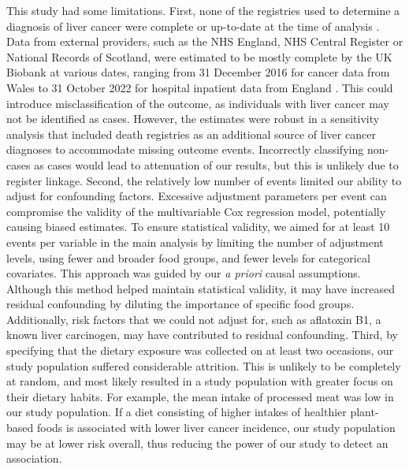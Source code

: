 \documentclass[sn-basic,Numbered,iicol,pdflatex]{sn-jnl}
\begin{document}
This study had some limitations. First, none of the registries used to
determine a diagnosis of liver cancer were complete or up-to-date at the
time of analysis \citep{RN112}. Data from external providers, such as the NHS
England, NHS Central Register or National Records of Scotland, were
estimated to be mostly complete by the UK Biobank at various dates,
ranging from 31 December 2016 for cancer data from Wales to 31 October
2022 for hospital inpatient data from England \citep{RN114}. This could
introduce misclassification of the outcome, as individuals with liver
cancer may not be identified as cases. However, the estimates were
robust in a sensitivity analysis that included death registries as an
additional source of liver cancer diagnoses to accommodate missing
outcome events. Incorrectly classifying non-cases as cases would lead to
attenuation of our results, but this is unlikely due to register
linkage. Second, the relatively low number of events limited our ability
to adjust for confounding factors. Excessive adjustment parameters per
event can compromise the validity of the multivariable Cox regression
model, potentially causing biased estimates. To ensure statistical
validity, we aimed for at least 10 events per variable in the main
analysis by limiting the number of adjustment levels, using fewer and
broader food groups, and fewer levels for categorical covariates. This
approach was guided by our \emph{a priori} causal assumptions. Although this
method helped maintain statistical validity, it may have increased
residual confounding by diluting the importance of specific food groups.
Additionally, risk factors that we could not adjust for, such as
aflatoxin B1, a known liver carcinogen, may have contributed to residual
confounding. Third, by specifying that the dietary exposure was
collected on at least two occasions, our study population suffered
considerable attrition. This is unlikely to be completely at random, and
most likely resulted in a study population with greater focus on their
dietary habits. For example, the mean intake of processed meat was low
in our study population. If a diet consisting of higher intakes of
healthier plant-based foods is associated with lower liver cancer
incidence, our study population may be at lower risk overall, thus
reducing the power of our study to detect an association.
\end{document}
